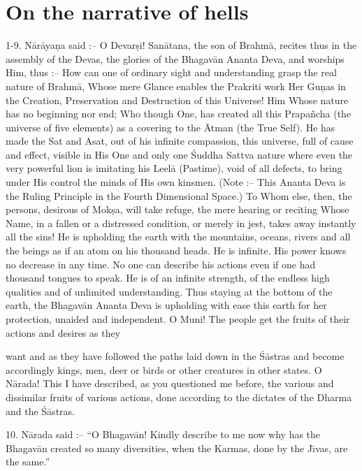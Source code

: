 \chapter{On the narrative of hells}

1-9. N\=ar\=aya\d{n}a said :-- O Devar\d{s}i! San\=atana, the son of Brahm\=a, recites thus in the assembly of the Devas, the glories of the Bhagav\=an Ananta Deva, and worships Him, thus :-- How can one of ordinary sight and understanding grasp the real nature of Brahm\=a, Whose mere Glance enables the Prakriti work Her Gu\d{n}as in the Creation, Preservation and Destruction of this Universe! Him Whose nature has no beginning nor end; Who though One, has created all this Prapa\~ncha (the universe of five elements) as a covering to the \=Atman (the True Self). He has made the Sat and Asat, out of his infinite compassion, this universe, full of cause and effect, visible in His One and only one \'Suddha Sattva nature where even the very powerful lion is imitating his Leel\=a (Pastime), void of all defects, to bring under His control the minds of His own kinsmen. (Note :-- This Ananta Deva is the Ruling Principle in the Fourth Dimensional Space.) To Whom else, then, the persons, desirous of Mok\d{s}a, will take refuge, the mere hearing or reciting Whose Name, in a fallen or a distressed condition, or merely in jest, takes away instantly all the sins! He is upholding the earth with the mountains, oceans, rivers and all the beings as if an atom on his thousand heads. He is infinite. His power knows no decrease in any time. No one can describe his actions even if one had thousand tongues to speak. He is of an infinite strength, of the endless high qualities and of unlimited understanding. Thus staying at the bottom of the earth, the Bhagav\=an Ananta Deva is upholding with ease this earth for her protection, unaided and independent. O Muni! The people get the fruits of their actions and desires as they

want and as they have followed the paths laid down in the \'S\=astras and become accordingly kings, men, deer or birds or other creatures in other states. O N\=arada! This I have described, as you questioned me before, the various and dissimilar fruits of various actions, done according to the dictates of the Dharma and the \'S\=astras.

10. N\=arada said :-- ``O Bhagav\=an! Kindly describe to me now why has the Bhagav\=an created so many diversities, when the Karmas, done by the J\={\i}vas, are the same.''

